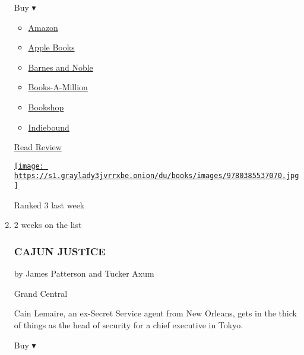 \begin{enumerate}
  Buy ▾

  \begin{itemize}
  \tightlist
  \item
    \href{https://www.amazon.com/Nickel-Boys-Novel-Colson-Whitehead/dp/0385537077?tag=NYTBS-20}{Amazon}
  \item
    \href{https://du-gae-books-dot-nyt-du-prd.appspot.com/buy?title=THE+NICKEL+BOYS\&author=Colson+Whitehead}{Apple
    Books}
  \item
    \href{https://www.anrdoezrs.net/click-7990613-11819508?url=https\%3A\%2F\%2Fwww.barnesandnoble.com\%2Fw\%2F\%3Fean\%3D9780345804341}{Barnes
    and Noble}
  \item
    \href{https://www.anrdoezrs.net/click-7990613-35140?url=https\%3A\%2F\%2Fwww.booksamillion.com\%2Fp\%2FTHE\%2BNICKEL\%2BBOYS\%2FColson\%2BWhitehead\%2F9780345804341}{Books-A-Million}
  \item
    \href{https://bookshop.org/a/3546/9780345804341}{Bookshop}
  \item
    \href{https://www.indiebound.org/book/9780345804341?aff=NYT}{Indiebound}
  \end{itemize}

  \href{https://www.nytimes3xbfgragh.onion/2019/07/11/books/review-nickel-boys-colson-whitehead.html}{Read
  Review}

  \href{https://www.nytimes3xbfgragh.onion/2019/07/11/books/review-nickel-boys-colson-whitehead.html}{\texttt{[image: https://s1.graylady3jvrrxbe.onion/du/books/images/9780385537070.jpg]}}

  Ranked 3 last week
\item
  2 weeks on the list

  \hypertarget{cajun-justice}{%
  \subsubsection{CAJUN JUSTICE}\label{cajun-justice}}

  by James Patterson and Tucker Axum

  Grand Central

  Cain Lemaire, an ex-Secret Service agent from New Orleans, gets in the
  thick of things as the head of security for a chief executive in
  Tokyo.

  Buy ▾


\end{enumerate}

